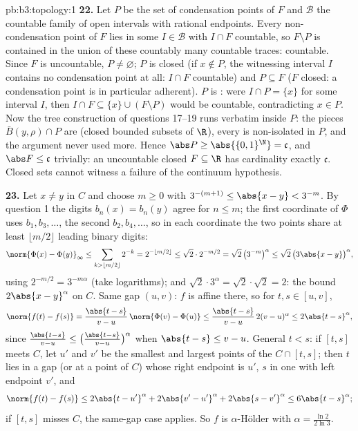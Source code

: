 \begin{solution}{pb:b3:topology:1}
\textbf{22.} Let $P$ be the set of condensation points of $F$
and $\mathcal B$ the countable family of open intervals with
rational endpoints. Every non-condensation point of $F$ lies
in some $I \in \mathcal B$ with $I \cap F$ countable, so $F
\setminus P$ is contained in the union of these countably
many countable traces: countable. Since $F$ is uncountable,
$P \neq \varnothing$; $P$ is closed (if $x \notin P$, the
witnessing interval $I$ contains no condensation point at
all: $I \cap F$ countable) and $P \subseteq F$ ($F$ closed:
a condensation point is in particular adherent). $P$ is
: were $I \cap P = \{x\}$ for some interval $I$, then
$I \cap F \subseteq \{x\} \cup (F \setminus P)$ would be
countable, contradicting $x \in P$. Now the tree construction
of questions 17--19 runs verbatim inside $P$: the pieces
$\bar B(y, \rho) \cap P$ are  (closed bounded subsets
of $\R$), every  is non-isolated in $P$, and the
argument never used more. Hence $\abs P \geq
\abs{\{0,1\}^\N} = \mathfrak c$, and $\abs F \leq \mathfrak
c$ trivially: an uncountable closed $F \subseteq \R$ has
cardinality exactly $\mathfrak c$. Closed sets cannot
witness a failure of the continuum hypothesis.

\textbf{23.} Let $x \neq y$ in $C$ and choose $m \geq 0$ with
$3^{-(m+1)} \leq \abs{x - y} < 3^{-m}$. By question 1 the
digits $b_n(x) = b_n(y)$ agree for $n \leq m$; the first
coordinate of $\Phi$ uses $b_1, b_3, \dots$, the second $b_2,
b_4, \dots$, so in each coordinate the two points share at
least $\lfloor m/2\rfloor$ leading binary digits:
\[
\norm{\Phi(x) - \Phi(y)}_\infty
\leq \sum_{k > \lfloor m/2\rfloor}2^{-k}
= 2^{-\lfloor m/2\rfloor} \leq \sqrt2\cdot2^{-m/2}
= \sqrt2\,\bigl(3^{-m}\bigr)^\alpha
\leq \sqrt2\,\bigl(3\abs{x-y}\bigr)^\alpha,
\]
using $2^{-m/2} = 3^{-m\alpha}$ (take logarithms); and
$\sqrt2\cdot3^\alpha = \sqrt2\cdot\sqrt2 = 2$: the bound
$2\abs{x-y}^\alpha$ on $C$. Same gap $(u, v)$: $f$ is affine
there, so for $t, s \in [u, v]$,
\[
\norm{f(t) - f(s)} = \frac{\abs{t-s}}{v-u}\,
\norm{\Phi(v) - \Phi(u)}
\leq \frac{\abs{t-s}}{v-u}\,2(v-u)^\alpha
\leq 2\abs{t-s}^\alpha,
\]
since $\frac{\abs{t-s}}{v-u} \leq \bigl(\frac{\abs{t-s}}
{v-u}\bigr)^\alpha$ when $\abs{t-s} \leq v - u$. General $t <
s$: if $[t, s]$ meets $C$, let $u'$ and $v'$ be the smallest
and largest points of the  $C \cap [t, s]$; then $t$
lies in a gap (or at a point of $C$) whose right endpoint is
$u'$, $s$ in one with left endpoint $v'$, and
\[
\norm{f(t) - f(s)} \leq 2\abs{t - u'}^\alpha
+ 2\abs{v' - u'}^\alpha + 2\abs{s - v'}^\alpha
\leq 6\abs{t - s}^\alpha ;
\]
if $[t, s]$ misses $C$, the same-gap case applies. So $f$ is
$\alpha$-H\"older with $\alpha = \frac{\ln2}{2\ln3}$.


\end{solution}
